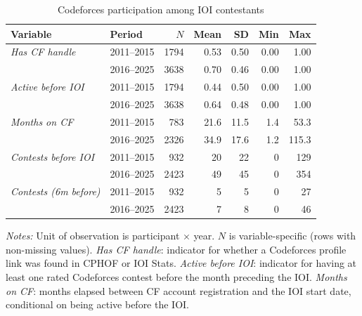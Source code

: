 \begin{table}[htbp]
\centering
\caption{Codeforces participation among IOI contestants}
\label{tab:cf_summary_by_year}
\begin{tabular}{l l r r r r r}
\toprule
Variable & Period & $N$ & Mean & SD & Min & Max \\
\midrule
\textit{Has CF handle} & 2011--2015 & 1794 & 0.53 & 0.50 & 0.00 & 1.00 \\
 & 2016--2025 & 3638 & 0.70 & 0.46 & 0.00 & 1.00 \\
\addlinespace
\textit{Active before IOI} & 2011--2015 & 1794 & 0.44 & 0.50 & 0.00 & 1.00 \\
 & 2016--2025 & 3638 & 0.64 & 0.48 & 0.00 & 1.00 \\
\addlinespace
\textit{Months on CF} & 2011--2015 & 783 & 21.6 & 11.5 & 1.4 & 53.3 \\
 & 2016--2025 & 2326 & 34.9 & 17.6 & 1.2 & 115.3 \\
\addlinespace
\textit{Contests before IOI} & 2011--2015 & 932 & 20 & 22 & 0 & 129 \\
 & 2016--2025 & 2423 & 49 & 45 & 0 & 354 \\
\addlinespace
\textit{Contests (6m before)} & 2011--2015 & 932 & 5 & 5 & 0 & 27 \\
 & 2016--2025 & 2423 & 7 & 8 & 0 & 46 \\
\bottomrule
\end{tabular}
\begin{minipage}{\linewidth}
\smallskip
\footnotesize
\textit{Notes:} Unit of observation is participant $\times$ year. $N$ is variable-specific (rows with non-missing values). \textit{Has CF handle}: indicator for whether a Codeforces profile link was found in CPHOF or IOI Stats. \textit{Active before IOI}: indicator for having at least one rated Codeforces contest before the month preceding the IOI. \textit{Months on CF}: months elapsed between CF account registration and the IOI start date, conditional on being active before the IOI.
\end{minipage}
\end{table}